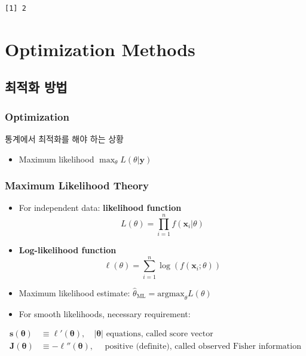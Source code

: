 \documentclass[
  letterpaper,
  DIV=11,
  numbers=noendperiod]{scrreprt}
\providecommand{\tightlist}{%
  \setlength{\itemsep}{0pt}\setlength{\parskip}{0pt}}\usepackage{longtable,booktabs,array}
\theoremstyle{definition}
\theoremstyle{definition}
\theoremstyle{remark}
\begin{document}
\begin{verbatim}
[1] 2
\end{verbatim}

\part{Optimization Methods}

\chapter{최적화 방법}\label{uxcd5cuxc801uxd654-uxbc29uxbc95}

\section{Optimization}\label{optimization}

통계에서 최적화를 해야 하는 상황

\begin{itemize}
\tightlist
\item
  Maximum likelihood \(\max_{\theta} L(\theta | \pmb{y})\)
\end{itemize}

\section{Maximum Likelihood Theory}\label{maximum-likelihood-theory}

\begin{itemize}
\item
  For independent data: \textbf{likelihood function} \[
  L(\theta) = \prod_{i=1}^n f(\pmb{x}_i | \theta)
  \]
\item
  \textbf{Log-likelihood function} \[
  \ell (\theta) = \sum_{i=1}^n \log (f(\pmb{x}_i ; \theta))
  \]
\item
  Maximum likelihood estimate:
  \(\hat{\theta}_{\text{ML}}=\text{argmax}_{\theta} L(\theta)\)
\item
  For smooth likelihoods, necessary requirement:
\end{itemize}

\begin{align*}
\pmb{s}(\pmb{\theta}) &\equiv \ell ' (\pmb{\theta}), \quad{} |\pmb{\theta}| \text{ equations, called score vector}\\
\pmb{J}(\pmb{\theta}) &\equiv -\ell '' (\pmb{\theta}), \quad{}\text{ positive (definite), called observed Fisher information}
\end{align*}
\end{document}
